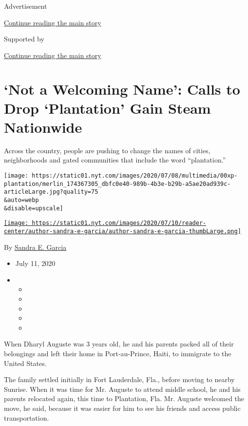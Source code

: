 Advertisement

\protect\hyperlink{after-top}{Continue reading the main story}

Supported by

\protect\hyperlink{after-sponsor}{Continue reading the main story}

\hypertarget{not-a-welcoming-name-calls-to-drop-plantation-gain-steam-nationwide}{%
\section{`Not a Welcoming Name': Calls to Drop `Plantation' Gain Steam
Nationwide}\label{not-a-welcoming-name-calls-to-drop-plantation-gain-steam-nationwide}}

Across the country, people are pushing to change the names of cities,
neighborhoods and gated communities that include the word
``plantation.''

\texttt{[image: https://static01.nyt.com/images/2020/07/08/multimedia/00xp-plantation/merlin\_174367305\_dbfc0e40-989b-4b3e-b29b-a5ae20ad939c-articleLarge.jpg?quality=75\\\&auto=webp\\\&disable=upscale]}

\href{https://www.nytimes.com/by/sandra-e-garcia}{\texttt{[image: https://static01.nyt.com/images/2020/07/10/reader-center/author-sandra-e-garcia/author-sandra-e-garcia-thumbLarge.png]}}

By \href{https://www.nytimes.com/by/sandra-e-garcia}{Sandra E. Garcia}

\begin{itemize}
\item
  July 11, 2020
\item
  \begin{itemize}
  \item
  \item
  \item
  \item
  \item
  \end{itemize}
\end{itemize}

When Dharyl Auguste was 3 years old, he and his parents packed all of
their belongings and left their home in Port-au-Prince, Haiti, to
immigrate to the United States.

The family settled initially in Fort Lauderdale, Fla., before moving to
nearby Sunrise. When it was time for Mr. Auguste to attend middle
school, he and his parents relocated again, this time to Plantation,
Fla. Mr. Auguste welcomed the move, he said, because it was easier for
him to see his friends and access public transportation.

